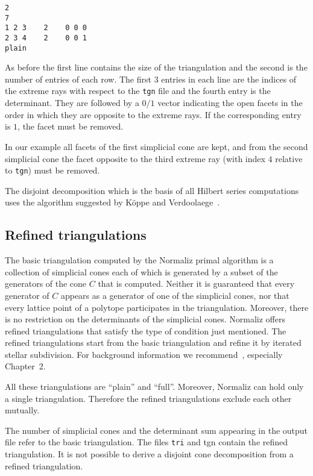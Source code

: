 \documentclass[12pt,a4paper]{scrartcl}
\theoremstyle{definition}
\def\ttt{\texttt}
\begin{document}
\begin{Verbatim}
2
7
1 2 3    2    0 0 0
2 3 4    2    0 0 1
plain
\end{Verbatim}

As before the first line contains the size of the triangulation and the second is the number of entries of each row.
The first $3$ entries in each line are the indices of the extreme rays with respect to the \verb|tgn| file and the fourth entry is the determinant. They are followed by a $0/1$ vector indicating the open facets in the order in which they are opposite to the extreme rays. If the corresponding entry is $1$, the facet must be removed.

In our example all facets of the first simplicial cone are kept, and from the second simplicial cone the facet opposite to the third extreme ray (with index $4$ relative to \verb|tgn|) must be removed.

The disjoint decomposition which is the basis of all Hilbert series computations uses the algorithm suggested by K\"oppe and Verdoolaege~\cite{KV}.

\subsection{Refined triangulations}

The basic triangulation computed by the Normaliz primal algorithm is a collection of simplicial cones each of which is generated by a subset of the generators of the cone $C$ that is computed. Neither it is guaranteed that every generator of $C$ appears as a generator of one of the simplicial cones, nor that every lattice point of a polytope participates in the triangulation. Moreover, there is no restriction on the determinants of the simplicial cones. Normaliz offers refined triangulations that satisfy the type of condition just mentioned. The refined triangulations start from the basic triangulation and refine it by iterated stellar subdivision. For background information we recommend~\cite{BG}, especially Chapter~2.

All these triangulations are ``plain'' and ``full''. Moreover, Normaliz can hold only a single triangulation. Therefore the refined triangulations exclude each other mutually.

The number of simplicial cones and the determinant sum appearing in the output file refer to the basic triangulation. The files \ttt{tri} and {tgn} contain the refined triangulation. It is not possible to derive a disjoint cone decomposition from a refined triangulation.
\end{document}
